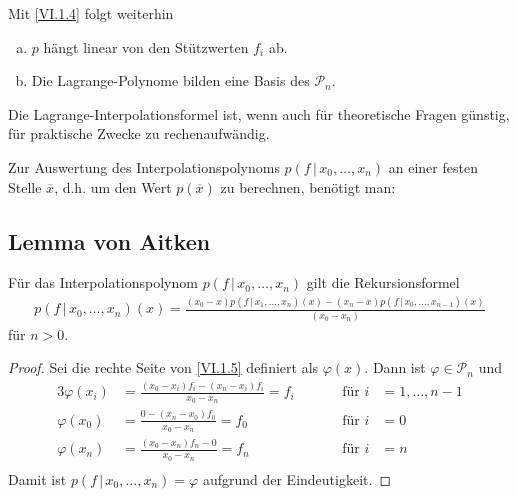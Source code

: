 \documentclass[ngerman,fontsize=11pt, paper=a4, parskip=half, titlepage=true, toc=bib]{scrbook}
\begin{document}
    Mit \eqref{VI.1.4} folgt weiterhin
    \begin{enumerate}[a)]
    \item $p$ hängt linear von den Stützwerten $f_i$ ab.
    \item Die Lagrange-Polynome bilden eine Basis des $\mathcal{P}_n$.
    \end{enumerate}

    Die Lagrange-Interpolationsformel ist,
    wenn auch für theoretische Fragen günstig,
    für praktische Zwecke zu rechenaufwändig.

    Zur Auswertung des Interpolationspolynoms $p(f\,|\,x_0,\dots, x_n)$
    an einer festen Stelle $\overline{x}$, d.h.
    um den Wert $p(\overline{x} ) $ zu berechnen,
    benötigt man:

    \subsection{Lemma von Aitken}
    Für das Interpolationspolynom $p(f\,|\,x_0, \dots, x_n)$ gilt die 
    Rekursionsformel
    \begin{gather}
      p(f\,|\,x_0, \dots, x_n) (x) = \frac{(x_0-x)p(f\,|\,x_1,\dots, x_n)(x) -
        (x_n-x)p(f\,|\,x_0,\dots, x_{n-1})(x)}
      {(x_0-x_n)}
      \label{VI.1.5}
    \end{gather}
    für $n>0$.


    \begin{proof}
      Sei die rechte Seite von \eqref{VI.1.5} definiert als $\varphi(x)$.
      Dann ist $\varphi\in\mathcal{P}_n$ und 
      \begin{alignat*}{3}
        \varphi(x_i) &= \frac{(x_0-x_i)f_i-(x_n-x_i)f_i}{x_0-x_n}= f_i\quad
        &&&\text{für } i&=1,\dots , n-1\\
        \varphi(x_0) &= \frac{0-(x_n-x_0)f_0}{x_0-x_n} = f_0
        &&&\text{für } i&=0\\
        \varphi(x_n) &= \frac{(x_0-x_n)f_n-0}{x_0-x_n} = f_n
        &&&\text{für } i&=n\\
      \end{alignat*}
      Damit ist $p(f\,|\,x_0, \dots, x_n) = \varphi$ aufgrund der Eindeutigkeit.
    \end{proof}

    
    
    
    
    \nocite{*} %

    


    \printindex		%

    \printbibliography	%


  
\end{document}
